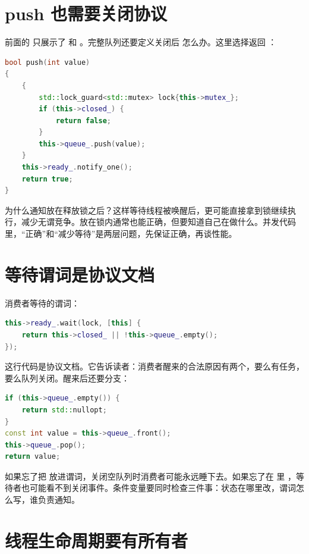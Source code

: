 \section{push 也需要关闭协议}

前面的  只展示了  和 。完整队列还要定义关闭后  怎么办。这里选择返回 ：

\begin{lstlisting}[language=C++,caption={关闭后拒绝插入}]
bool push(int value)
{
    {
        std::lock_guard<std::mutex> lock{this->mutex_};
        if (this->closed_) {
            return false;
        }
        this->queue_.push(value);
    }
    this->ready_.notify_one();
    return true;
}
\end{lstlisting}

为什么通知放在释放锁之后？这样等待线程被唤醒后，更可能直接拿到锁继续执行，减少无谓竞争。放在锁内通常也能正确，但要知道自己在做什么。并发代码里，“正确”和“减少等待”是两层问题，先保证正确，再谈性能。

\section{等待谓词是协议文档}

消费者等待的谓词：

\begin{lstlisting}[language=C++,caption={等待条件写成谓词}]
this->ready_.wait(lock, [this] {
    return this->closed_ || !this->queue_.empty();
});
\end{lstlisting}

这行代码是协议文档。它告诉读者：消费者醒来的合法原因有两个，要么有任务，要么队列关闭。醒来后还要分支：

\begin{lstlisting}[language=C++,caption={醒来后区分任务和关闭}]
if (this->queue_.empty()) {
    return std::nullopt;
}
const int value = this->queue_.front();
this->queue_.pop();
return value;
\end{lstlisting}

如果忘了把  放进谓词，关闭空队列时消费者可能永远睡下去。如果忘了在  里 ，等待者也可能看不到关闭事件。条件变量要同时检查三件事：状态在哪里改，谓词怎么写，谁负责通知。

\section{线程生命周期要有所有者}

